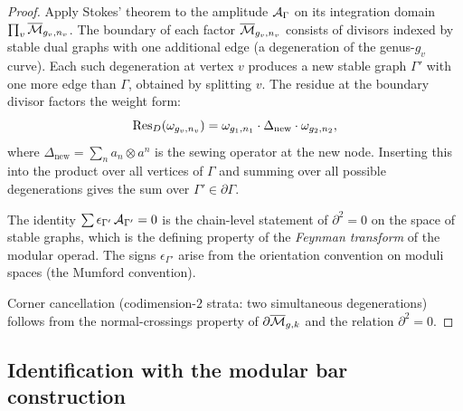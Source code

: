 \begin{proof}
Apply Stokes' theorem to the amplitude $\mathcal{A}_\Gamma$ on its
integration domain $\prod_v \overline{\mathcal{M}}_{g_v, n_v}$. The
boundary of each factor $\overline{\mathcal{M}}_{g_v, n_v}$ consists of
divisors indexed by stable dual graphs with one additional edge
(a degeneration of the genus-$g_v$ curve). Each such degeneration
at vertex $v$ produces a new stable graph $\Gamma'$ with one more
edge than $\Gamma$, obtained by splitting $v$. The residue at the
boundary divisor factors the weight form:
\[
\operatorname{Res}_{D}(\omega_{g_v, n_v})
= \omega_{g_1, n_1} \cdot \Delta_{\mathrm{new}} \cdot
\omega_{g_2, n_2},
\]
where $\Delta_{\mathrm{new}} = \sum_n a_n \otimes a^n$ is the
sewing operator at the new node. Inserting this into the product
over all vertices of $\Gamma$ and summing over all possible
degenerations gives the sum over $\Gamma' \in \partial\Gamma$.

The identity $\sum \epsilon_{\Gamma'}\,\mathcal{A}_{\Gamma'} = 0$ is
the chain-level statement of $\partial^2 = 0$ on the space of
stable graphs, which is the defining property of the
\emph{Feynman transform} of the modular operad. The signs
$\epsilon_{\Gamma'}$ arise from the orientation convention on
moduli spaces (the Mumford convention).

Corner cancellation (codimension-$2$ strata: two simultaneous
degenerations) follows from the normal-crossings property of
$\partial\overline{\mathcal{M}}_{g,k}$ and the relation $\partial^2 = 0$.
\end{proof}

\subsection{Identification with the modular bar construction}

